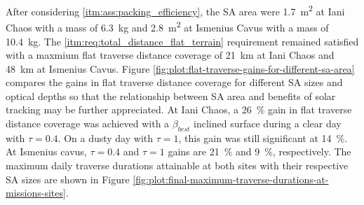 After considering \ref{itm:ass:packing_efficiency}, the \ac{SA} area were \SI{1.7}{m^{2}} at Iani Chaos with a mass of \SI{6.3}{\kilo\gram} and \SI{2.8}{m^{2}} at Ismenius Cavus with a mass of  \SI{10.4}{\kilo\gram}. The \ref{itm:req:total_distance_flat_terrain} requirement remained satisfied with
a maxmium flat traverse distance coverage of \SI{21}{\kilo\meter} at Iani Chaos and \SI{48}{\kilo\meter} at Ismenius Cavus. Figure \ref{fig:plot:flat-traverse-gains-for-different-sa-area} compares the gains in flat traverse distance coverage for different \ac{SA} sizes and optical depths so that the relationship between \ac{SA} area and benefits of solar tracking may be further appreciated. At Iani Chaos, a \SI{26}{\percent} gain in flat traverse distance coverage was achieved with a $\beta_{best}$ inclined surface during a clear day with $\tau = 0.4$. On a dusty day with $\tau = 1$, this gain was still significant at \SI{14}{\percent}. At Ismenius cavus, $\tau = 0.4$ and $\tau = 1$ gains are \SI{21}{\percent} and \SI{9}{\percent}, respectively. The maximum daily traverse durations attainable at both sites with their respective \ac{SA} sizes are shown in Figure \ref{fig:plot:final-maximum-traverse-durations-at-missions-sites}.



